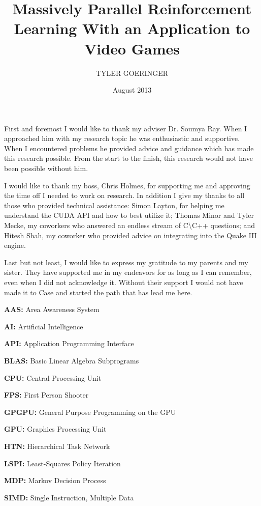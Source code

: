 \clearpage{}

\title{Massively Parallel Reinforcement Learning With an Application to Video Games}
\author{TYLER GOERINGER}
\date{August 2013}
\maketitle


\committeeapprovalpage

\begin{acknowledgments}
First and foremost I would like to thank my adviser Dr. Soumya Ray. When I approached him with my research topic he was enthusiastic and supportive. When I encountered problems he provided advice and guidance which has made this research possible. From the start to the finish, this research would not have been possible without him.
    
I would like to thank my boss, Chris Holmes, for supporting me and approving the time off I needed to work on research. In addition I give my thanks to all those who provided technical assistance: Simon Layton, for helping me understand the CUDA API and how to best utilize it; Thomas Minor and Tyler Mecke, my coworkers who answered an endless stream of C\textbackslash C++ questions; and Hitesh Shah, my coworker who provided advice on integrating into the Quake III engine.

Last but not least, I would like to express my gratitude to my parents and my sister. They have supported me in my endeavors for as long as I can remember, even when I did not acknowledge it. Without their support I would not have made it to Case and started the path that has lead me here.
\end{acknowledgments}

\tableofcontents
\listoftables
\listoffigures

\begin{abbreviations}
    \textbf{AAS:} Area Awareness System

    \textbf{AI:} Artificial Intelligence

    \textbf{API:} Application Programming Interface
    
    \textbf{BLAS:} Basic Linear Algebra Subprograms
    
    \textbf{CPU:} Central Processing Unit
    
    \textbf{FPS:} First Person Shooter
    
    \textbf{GPGPU:} General Purpose Programming on the GPU
    
    \textbf{GPU:} Graphics Processing Unit
    
    \textbf{HTN:} Hierarchical Task Network
    
    \textbf{LSPI:} Least-Squares Policy Iteration
    
    \textbf{MDP:} Markov Decision Process
    
    \textbf{SIMD:} Single Instruction, Multiple Data
\end{abbreviations}

